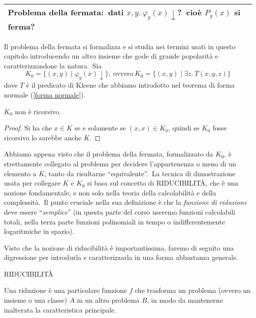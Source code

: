 \begin{table}[H]
    \centering
    \begin{tabular}{|l|}
        \hline
        \textbf{Problema della fermata}:\ dati $x,y.\ \varphi_y(x)\downarrow$?\ cioè $P_y(x)$ si ferma? \\\hline
    \end{tabular}
\end{table}

\noindent Il problema della fermata si formalizza e si studia nei termini usati in questo capitolo introducendo un altro insieme che gode di grande popolarità e caratterizzandone la natura.\
Sia
\[K_0 = \{(x,y) \mid \varphi_y(x)\downarrow\},\ \mathrm{ovvero}\ K_0 = \{(x,y) \mid \exists z.\ T(x,y,z)\} \]
dove $T$ è il predicato di Kleene che abbiamo introdotto nel teorema di forma normale (\ref{forma normale}).

\begin{corollario}
    $K_0$ non è ricorsivo.
\end{corollario}

\begin{proof}
    Si ha che $x \in K$ se e solamente se $(x,x) \in K_0$, quindi se $K_0$ fosse ricorsivo lo sarebbe anche $K$.
\end{proof}

\noindent Abbiamo appena visto che il problema della fermata, formalizzato da $K_0$, è strettamente collegato al problema per decidere l'appartenenza o meno di un elemento a $K$, tanto da risultarne ``equivalente''.\
La tecnica di dimostrazione usata per collegare $K$ e $K_0$ si basa sul concetto di {\footnotesize RIDUCIBILITÀ}, che è una nozione fondamentale, e non solo nella teoria della calcolabilità e della complessità.\
Il punto cruciale nella sua definizione è che la \textit{funzione di riduzione} deve essere ``\textit{semplice}'' (in questa parte del corso useremo funzioni calcolabili totali, nella terza parte funzioni polinomiali in tempo o indifferentemente logaritmiche in spazio).\

Visto che la nozione di riducibilità è importantissima, faremo di seguito una digressione per introdurla e caratterizzarla in una forma abbastanza generale.

\vspace{24pt}
\noindent\hrulefill

\noindent\hrulefill RIDUCIBILITÀ\hrulefill

\vspace{6pt}
\noindent Una riduzione è una particolare funzione $f$ che trasforma un problema (ovvero un insieme o una classe) $A$ in un altro problema $B$, in modo da mantenerne inalterata la caratteristica principale.


